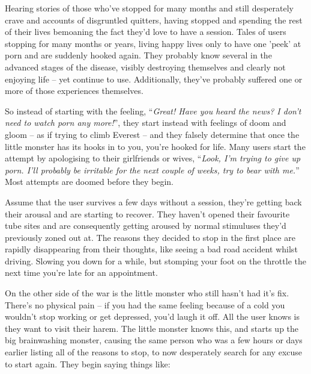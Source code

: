 \documentclass[
]{book}
\begin{document}
Hearing stories of those who've stopped for many months and still desperately crave and accounts of disgruntled quitters, having stopped and spending the rest of their lives bemoaning the fact they'd love to have a session. Tales of users stopping for many months or years, living happy lives only to have one 'peek' at porn and are suddenly hooked again. They probably know several in the advanced stages of the disease, visibly destroying themselves and clearly not enjoying life -- yet continue to use. Additionally, they've probably suffered one or more of those experiences themselves.

So instead of starting with the feeling, ``\emph{Great! Have you heard the news? I don't need to watch porn any more!}'', they start instead with feelings of doom and gloom -- as if trying to climb Everest -- and they falsely determine that once the little monster has its hooks in to you, you're hooked for life. Many users start the attempt by apologising to their girlfriends or wives, ``\emph{Look, I'm trying to give up porn. I'll probably be irritable for the next couple of weeks, try to bear with me.}'' Most attempts are doomed before they begin.

Assume that the user survives a few days without a session, they're getting back their arousal and are starting to recover. They haven't opened their favourite tube sites and are consequently getting aroused by normal stimuluses they'd previously zoned out at. The reasons they decided to stop in the first place are rapidly disappearing from their thoughts, like seeing a bad road accident whilst driving. Slowing you down for a while, but stomping your foot on the throttle the next time you're late for an appointment.

On the other side of the war is the little monster who still hasn't had it's fix. There's no physical pain -- if you had the same feeling because of a cold you wouldn't stop working or get depressed, you'd laugh it off. All the user knows is they want to visit their harem. The little monster knows this, and starts up the big brainwashing monster, causing the same person who was a few hours or days earlier listing all of the reasons to stop, to now desperately search for any excuse to start again. They begin saying things like:
\end{document}
